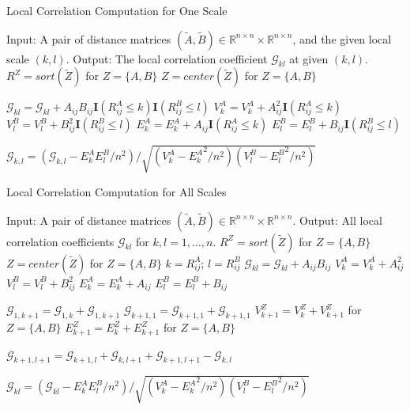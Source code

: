 \documentclass[11pt]{article}
\providecommand{\mb}[1]{\boldsymbol{#1}}
\newcommand{\Real}{\mathbb{R}}
\newcommand{\G}{\mathcal{G}}
\begin{document}
\begin{algorithm}
\caption{Local Correlation Computation for One Scale}
\label{alg1}
\begin{algorithmic}
\State Input: A pair of distance matrices $(\tilde{A},\tilde{B}) \in \Real^{n \times n} \times \Real^{n \times n}$, and the given local scale $(k,l)$.
\State Output: The local correlation coefficient $\G_{kl}$ at given $(k,l)$.
\State $R^{Z}=sort(\tilde{Z})$ for $Z=\{A,B\}$ 
\State $Z=center(\tilde{Z})$ for $Z=\{A,B\}$ 

\State $\G_{kl}=\G_{kl}+A_{ij}B_{ij}\mb{I}(R^{A}_{ij} \leq k)\mb{I}(R^{B}_{ij} \leq l)$ 
\State $V^{A}_{k}=V^{A}_{k}+A_{ij}^2\mb{I}(R^{A}_{ij} \leq k)$ 
\State $V^{B}_{l}=V^{B}_{l}+B_{ij}^2\mb{I}(R^{B}_{ij} \leq l)$ 
\State $E^{A}_{k}=E^{A}_{k}+A_{ij}\mb{I}(R^{A}_{ij} \leq k)$ 
\State $E^{B}_{l}=E^{B}_{l}+B_{ij}\mb{I}(R^{B}_{ij} \leq l)$
\EndFor

\State $\G_{k,l}=\left(\G_{k,l}-E^{A}_{k}E^{B}_{l}/n^2\right)/\sqrt{\left(V^{A}_{k}-{E^{A}_{k}}^2/n^2\right) \left(V^{B}_{l}-{E^{B}_{l}}^2/n^2\right)}$ 

\EndFunction
\end{algorithmic}
\end{algorithm}

\begin{algorithm}
\caption{Local Correlation Computation for All Scales}
\label{alg2}
\begin{algorithmic}
\State Input: A pair of distance matrices $(\tilde{A},\tilde{B}) \in \Real^{n \times n} \times \Real^{n \times n}$.
\State Output: All local correlation coefficients $\G_{kl}$ for $k,l=1,\ldots,n$.
\State $R^{Z}=sort(\tilde{Z})$ for $Z=\{A,B\}$ 
\State $Z=center(\tilde{Z})$ for $Z=\{A,B\}$ 
\State $k=R^{A}_{ij}$; $l=R^{B}_{ij}$
\State $\G_{kl}=\G_{kl}+A_{ij}B_{ij}$
\State $V^{A}_{k}=V^{A}_{k}+A_{ij}^2$
\State $V^{B}_{l}=V^{B}_{l}+B_{ij}^2$
\State $E^{A}_{k}=E^{A}_{k}+A_{ij}$ 
\State $E^{B}_{l}=E^{B}_{l}+B_{ij}$
\EndFor

\State $\G_{1, k+1}=\G_{1, k}+\G_{1, k+1}$
\State $\G_{k+1,1}=\G_{k+1,1}+\G_{k+1,1}$
\State $V^{Z}_{k+1}=V^{Z}_{k}+V^{Z}_{k+1}$ for $Z=\{A,B\}$ 
\State $E^{Z}_{k+1}=E^{Z}_{k}+E^{Z}_{k+1}$ for $Z=\{A,B\}$ 
\EndFor

\State $\G_{k+1,l+1}=\G_{k+1,l}+\G_{k,l+1}+\G_{k+1,l+1}-\G_{k,l}$
\EndFor

\State $\G_{kl}=\left(\G_{kl}-E^{A}_{k}E^{B}_{l}/n^2\right)/\sqrt{\left(V^{A}_{k}-{E^{A}_{k}}^2/n^2\right) \left(V^{B}_{l}-{E^{B}_{l}}^2/n^2\right)}$
\EndFor
\EndFunction
\end{algorithmic}
\end{algorithm}
\end{document}
